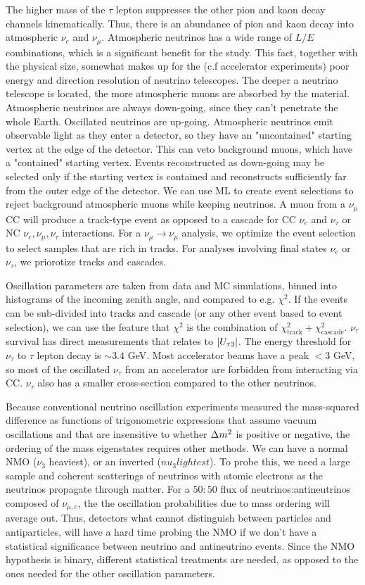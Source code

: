 \documentclass[twocolumn]{article}
\renewcommand{\ne}{\ensuremath{\nu_e}}
\newcommand{\nm}{\ensuremath{\nu_\mu}}
\newcommand{\nt}{\ensuremath{\nu_\tau}}
\newcommand{\nmm}{\ensuremath{\nu_\mu \to \nu_\mu}}
\renewcommand{\t}[1]{\ensuremath{\text{{#1}}}}
\newcommand*{\dm}[1][]{%
  \Delta m^2\ifx\\#1\\\else_\text{#1}\fi
}
\begin{document}
The higher mass of the $\tau$ lepton suppresses the other pion and kaon decay channels kinematically. Thus, there is an abundance of pion and kaon decay into atmospheric $\ne$ and $\nm$. Atmospheric neutrinos has a wide range of $L / E$ combinations, which is a significant benefit for the study. This fact, together with the physical size, somewhat makes up for the (c.f accelerator experiments) poor energy and direction resolution of neutrino telescopes. The deeper a neutrino telescope is
located, the more atmospheric muons are absorbed by the material. Atmospheric neutrinos are always down-going, since they can't penetrate the whole Earth. Oscillated neutrinos are up-going. Atmospheric neutrinos emit observable light as they enter a detector, so they have an "uncontained" starting vertex at the edge of the detector. This can veto background muons, which have a "contained" starting vertex. Events reconstructed as down-going may be selected only if the starting vertex is contained and reconstructs sufficiently far from the outer edge of the detector. We can use ML to create event selections to reject background atmospheric muons while keeping neutrinos. A muon from a $\nm$ CC will produce a track-type event as opposed to a cascade for CC $\ne$ and $\nt$ or NC $\ne, \nm, \nt$ interactions. For a $\nmm$ analysis, we optimize the event selection to select samples that are rich in tracks. For analyses involving final states $\ne$ or $\nt$, we priorotize tracks and cascades.

Oscillation parameters are taken from data and MC simulations, binned into histograms of the incoming zenith angle, and compared to e.g. $\chi^2$. If the events can be sub-divided into tracks and cascade (or any other event based to event selection), we can use the feature that $\chi^2$ is the combination of $\chi^2_\t{track} + \chi^2_\t{cascade}$.
$\nt$ survival has direct measurements that relates to $\abs{U_{\tau 3}}$. The energy threshold for $\nt$ to $\tau$ lepton decay is $\sim 3.4$ GeV. Most accelerator beams have a peak $< 3$ GeV, so most of the oscillated $\nt$ from an accelerator are forbidden from interacting via CC. $\nt$ also has a smaller cross-section compared to the other neutrinos. 

Because conventional neutrino oscillation experiments measured the mass-squared difference as functions of trigonometric expressions that assume vacuum oscillations and that are insensitive to whether $\dm$ is positive or negative, the ordering of the mass eigenstates requires other methods. We can have a normal NMO ($\nu_3$ heaviest), or an inverted ($nu_3 lightest$). To probe this, we need a large sample and coherent scatterings of neutrinos with atomic electrons as the neutrinos propagate through matter. For a $50:50$ flux of neutrinos:antineutrinos composed of $\nu_{\mu,e}$, the the oscillation probabilities due to mass ordering will average out. Thus, detectors what cannot distinguish between particles and antiparticles, will have a hard time probing the NMO if we don't have a statistical significance between neutrino and antineutrino events. Since the NMO hypothesis is binary, different statistical treatments are needed, as opposed to the ones needed for the other oscillation parameters.
\end{document}

